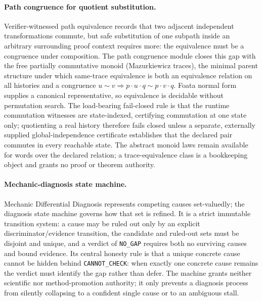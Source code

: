 \paragraph{Path congruence for quotient substitution.}
Verifier-witnessed path equivalence records that two adjacent independent transformations commute, but safe substitution of one subpath inside an arbitrary surrounding proof context requires more: the equivalence must be a congruence under composition. The path congruence module closes this gap with the free partially commutative monoid (Mazurkiewicz traces), the minimal parent structure under which same-trace equivalence is both an equivalence relation on all histories and a congruence $u\sim v\Rightarrow p\cdot u\cdot q\sim p\cdot v\cdot q$. Foata normal form supplies a canonical representative, so equivalence is decidable without permutation search. The load-bearing fail-closed rule is that the runtime commutation witnesses are state-indexed, certifying commutation at one state only; quotienting a real history therefore fails closed unless a separate, externally supplied global-independence certificate establishes that the declared pair commutes in every reachable state. The abstract monoid laws remain available for words over the declared relation; a trace-equivalence class is a bookkeeping object and grants no proof or theorem authority.

\paragraph{Mechanic-diagnosis state machine.}
Mechanic Differential Diagnosis represents competing causes set-valuedly; the diagnosis state machine governs how that set is refined. It is a strict immutable transition system: a cause may be ruled out only by an explicit discriminator/evidence transition, the candidate and ruled-out sets must be disjoint and unique, and a verdict of \texttt{NO\_GAP} requires both no surviving causes and bound evidence. Its central honesty rule is that a unique concrete cause cannot be hidden behind \texttt{CANNOT\_CHECK}: when exactly one concrete cause remains the verdict must identify the gap rather than defer. The machine grants neither scientific nor method-promotion authority; it only prevents a diagnosis process from silently collapsing to a confident single cause or to an ambiguous stall.

